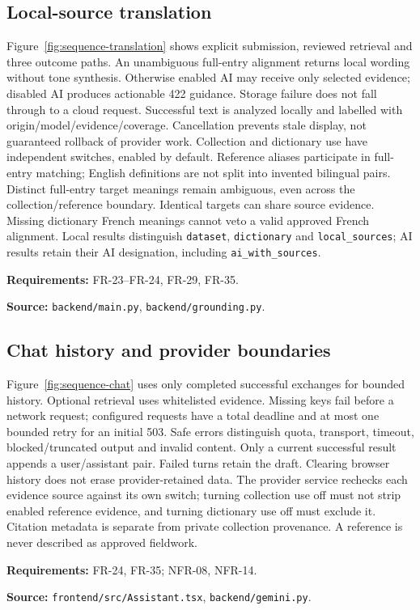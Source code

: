 \documentclass[11pt,a4paper]{article}
\newcommand{\viewtrace}[2]{\par\smallskip\noindent\textbf{Requirements:} #1.\par
  \noindent\textbf{Source:} #2.\par\medskip}
\begin{document}
\subsection{Local-source translation}
Figure~\ref{fig:sequence-translation} shows explicit submission, reviewed
retrieval and three outcome paths. An unambiguous full-entry alignment returns
local wording without tone synthesis. Otherwise enabled AI may receive only
selected evidence; disabled AI produces actionable 422 guidance. Storage
failure does not fall through to a cloud request. Successful text is analyzed
locally and labelled with origin/model/evidence/coverage.
Cancellation prevents stale display, not guaranteed rollback of provider work.
Collection and dictionary use have independent switches, enabled by default.
Reference aliases participate in full-entry matching; English definitions
are not split into invented bilingual pairs. Distinct full-entry target meanings
remain ambiguous, even across the collection/reference boundary. Identical
targets can share source evidence. Missing dictionary French meanings cannot
veto a valid approved French alignment. Local results distinguish
\texttt{dataset}, \texttt{dictionary} and \texttt{local\_sources}; AI results
retain their AI designation, including \texttt{ai\_with\_sources}.
\viewtrace{FR-23--FR-24, FR-29, FR-35}{\nolinkurl{backend/main.py}, \nolinkurl{backend/grounding.py}}

\subsection{Chat history and provider boundaries}
Figure~\ref{fig:sequence-chat} uses only completed successful exchanges for
bounded history. Optional retrieval uses whitelisted evidence. Missing keys
fail before a network request; configured requests have a total deadline and
at most one bounded retry for an initial 503. Safe errors distinguish quota,
transport, timeout, blocked/truncated output and invalid content.
Only a current successful result appends a user/assistant pair. Failed turns
retain the draft. Clearing browser history does not erase provider-retained data.
The provider service rechecks each evidence source against its own switch;
turning collection use off must not strip enabled reference evidence, and
turning dictionary use off must exclude it. Citation metadata is separate from
private collection provenance. A reference is never described as approved fieldwork.
\viewtrace{FR-24, FR-35; NFR-08, NFR-14}
{\nolinkurl{frontend/src/Assistant.tsx}, \nolinkurl{backend/gemini.py}}
\end{document}
